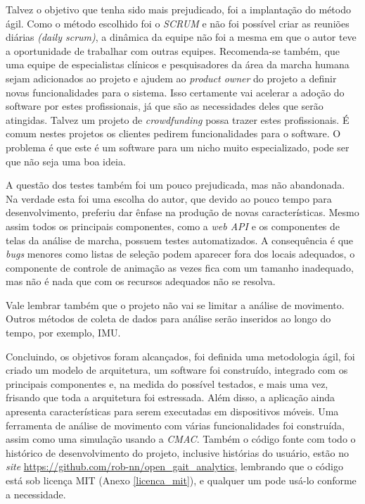 Talvez o objetivo que tenha sido mais prejudicado, foi a implantação do método ágil. 
Como o método escolhido foi o \emph{SCRUM} e não foi possível criar as reuniões diárias \emph{(daily scrum)}, a dinâmica da equipe não foi a mesma em que o autor teve a oportunidade de trabalhar com outras equipes.
Recomenda-se também, que uma equipe de especialistas clínicos e pesquisadores da área da marcha humana sejam adicionados ao projeto e ajudem ao \emph{product owner} do projeto a definir novas funcionalidades para o sistema. 
Isso certamente vai acelerar a adoção do software por estes profissionais, já que são as necessidades deles que serão atingidas.
Talvez um projeto de \emph{crowdfunding} possa trazer estes profissionais. 
É comum nestes projetos os clientes pedirem funcionalidades para o software.
O problema é que este é um software para um nicho muito especializado, pode ser que não seja uma boa ideia.


A questão dos testes também foi um pouco prejudicada, mas não abandonada. Na verdade esta foi uma escolha do autor, que devido ao pouco tempo para desenvolvimento, preferiu dar ênfase na produção de novas características. Mesmo assim todos os principais componentes, como a \emph{web API} e os componentes de telas da análise de marcha, possuem testes automatizados.
A consequência é que \emph{bugs} menores como listas de seleção podem aparecer fora dos locais adequados, o componente de controle de animação as vezes fica com um tamanho inadequado, mas não é nada que com os recursos adequados não se resolva.

Vale lembrar também que o projeto não vai se limitar a análise de movimento. 
Outros métodos de coleta de dados para análise serão inseridos ao longo do tempo, por exemplo, IMU.


Concluindo, os objetivos foram alcançados, foi definida uma metodologia ágil, foi criado um modelo de arquitetura, um software foi construído, integrado com os principais componentes e, na medida do possível testados, e mais uma vez, frisando que toda a arquitetura foi estressada. 
Além disso, a aplicação ainda apresenta características para serem executadas em dispositivos móveis. 
Uma ferramenta de análise de movimento com várias funcionalidades foi construída, assim como uma simulação usando a \emph{CMAC}.
Também o código fonte com todo o histórico de desenvolvimento do projeto, inclusive histórias do usuário, estão no \emph{site} \url{https://github.com/rob-nn/open\_gait\_analytics}, lembrando que o código está sob licença MIT (Anexo \ref{licenca_mit}), e qualquer um pode usá-lo conforme a necessidade.
